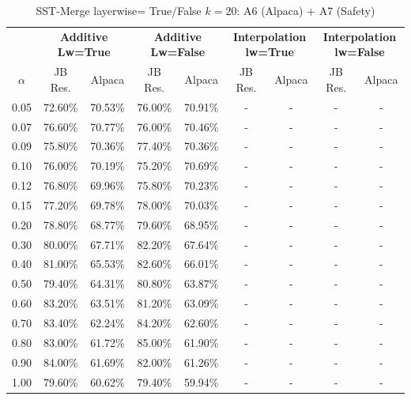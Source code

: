\begin{table}[h]
\centering
\caption{SST-Merge layerwise= True/False $k=20$: A6 (Alpaca) + A7 (Safety)}
\label{tab:res_a6_sst_merge_20}
\begin{tabular}{c|cc|cc|cc|cc}
\hline
 & \multicolumn{2}{c|}{\textbf{Additive Lw=True}} & \multicolumn{2}{c|}{\textbf{Additive Lw=False}} & \multicolumn{2}{c|}{\textbf{Interpolation lw=True}}& \multicolumn{2}{c}{\textbf{Interpolation lw=False}} \\
$\alpha$ & JB Res. & Alpaca & JB Res. & Alpaca & JB Res. & Alpaca & JB Res. & Alpaca \\
\hline
0.05 & 72.60\% & 70.53\% & 76.00\% & 70.91\% & - & - & - & - \\
0.07 & 76.60\% & 70.77\% & 76.00\% & 70.46\% & - & - & - & - \\
0.09 & 75.80\% & 70.36\% & 77.40\% & 70.36\% & - & - & - & - \\
0.10 & 76.00\% & 70.19\% & 75.20\% & 70.69\% & - & - & - & - \\
0.12 & 76.80\% & 69.96\% & 75.80\% & 70.23\% & - & - & - & - \\
0.15 & 77.20\% & 69.78\% & 78.00\% & 70.03\% & - & - & - & - \\
0.20 & 78.80\% & 68.77\% & 79.60\% & 68.95\% & - & - & - & - \\
0.30 & 80.00\% & 67.71\% & 82.20\% & 67.64\% & - & - & - & - \\
0.40 & 81.00\% & 65.53\% & 82.60\% & 66.01\% & - & - & - & - \\
0.50 & 79.40\% & 64.31\% & 80.80\% & 63.87\% & - & - & - & - \\
0.60 & 83.20\% & 63.51\% & 81.20\% & 63.09\% & - & - & - & - \\
0.70 & 83.40\% & 62.24\% & 84.20\% & 62.60\% & - & - & - & - \\
0.80 & 83.00\% & 61.72\% & 85.00\% & 61.90\% & - & - & - & - \\
0.90 & 84.00\% & 61.69\% & 82.00\% & 61.26\% & - & - & - & - \\
1.00 & 79.60\% & 60.62\% & 79.40\% & 59.94\% & - & - & - & - \\
\hline
\end{tabular}
\end{table}
\FloatBarrier

